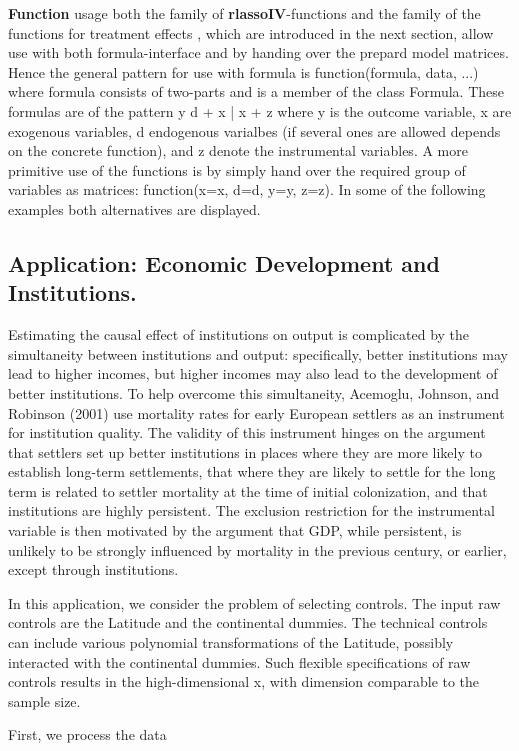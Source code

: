 \documentclass[12pt,a4paper]{article}
\begin{document}
\textbf{Function} usage both the family of \textbf{rlassoIV}-functions and the family of the functions for treatment effects , which are introduced in the next section, allow use with both formula-interface and by handing over the prepard model matrices. Hence the general pattern for use with formula is function(formula, data, ...) where formula consists of two-parts and is a member of the class Formula. These formulas are of the pattern y d + x | x + z where y is the outcome variable, x are exogenous variables, d endogenous varialbes (if several ones are allowed depends on the concrete function), and z denote the instrumental variables. A more primitive use of the functions is by simply hand over the required group of variables as matrices: function(x=x, d=d, y=y, z=z). In some of the following examples both alternatives are displayed.

\subsection{Application: Economic Development and Institutions.}
Estimating the causal effect of institutions on output is complicated by the simultaneity between institutions and output: specifically, better institutions may lead to higher incomes, but higher incomes may also lead to the development of better institutions. To help overcome this simultaneity, Acemoglu, Johnson, and Robinson (2001) use mortality rates for early European settlers as an instrument for institution quality. The validity of this instrument hinges on the argument that settlers set up better institutions in places where they are more likely to establish long-term settlements, that where they are likely to settle for the long term is related to settler mortality at the time of initial colonization, and that institutions are highly persistent. The exclusion restriction for the instrumental variable is then motivated by the argument that GDP, while persistent, is unlikely to be strongly influenced by mortality in the previous century, or earlier, except through institutions.

In this application, we consider the problem of selecting controls. The input raw controls are the Latitude and the continental dummies. The technical controls can include various polynomial transformations of the Latitude, possibly interacted with the continental dummies. Such flexible specifications of raw controls results in the high-dimensional x, with dimension comparable to the sample size.

First, we process the data
\end{document}
